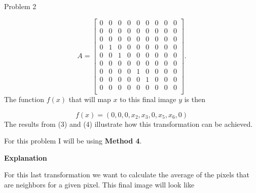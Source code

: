 \begin{problem}{Problem 2}
\begin{Highlight}
        \begin{equation}
            A =
            \begin{bmatrix}
                0 & 0 & 0 & 0 & 0 & 0 & 0 & 0 & 0 \\
                0 & 0 & 0 & 0 & 0 & 0 & 0 & 0 & 0 \\
                0 & 0 & 0 & 0 & 0 & 0 & 0 & 0 & 0 \\
                0 & 1 & 0 & 0 & 0 & 0 & 0 & 0 & 0 \\
                0 & 0 & 1 & 0 & 0 & 0 & 0 & 0 & 0 \\
                0 & 0 & 0 & 0 & 0 & 0 & 0 & 0 & 0 \\
                0 & 0 & 0 & 0 & 1 & 0 & 0 & 0 & 0 \\
                0 & 0 & 0 & 0 & 0 & 1 & 0 & 0 & 0 \\
                0 & 0 & 0 & 0 & 0 & 0 & 0 & 0 & 0 \\
            \end{bmatrix}.
        \end{equation}
        The function $f(x)$ that will map $x$ to this final image $y$ is then

        \begin{equation}
            f(x) = (0,0,0,x_{2},x_{3},0,x_{5},x_{6},0)
        \end{equation}
        The results from (3) and (4) illustrate how this transformation can be achieved.
    \end{Highlight}

    \begin{Highlight}
        For this problem I will be using \textbf{Method 4}. \vspace*{1em}

        \noindent \textbf{Explanation} \vspace*{1em}

        For this last transformation we want to calculate the average of the pixels that are neighbors for a given pixel. This final image will look like


\end{Highlight}
\end{problem}
